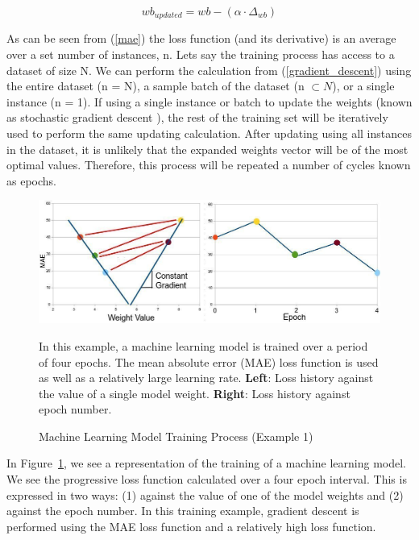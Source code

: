  \begin{equation} \label{gradient_descent}
 	wb_{updated} = wb - (\alpha \cdot \Delta_{wb})
 \end{equation}
 
 \noindent
As can be seen from (\ref{mae}) the loss function (and its derivative) is an average over a set number of instances, n. Lets say the training process has access to a dataset of size N. We can perform the calculation from (\ref{gradient_descent})  using the entire dataset (n = N), a sample batch of the dataset (n $\subset N$), or a single instance (n = 1). If using a single instance or batch to update the weights (known as stochastic gradient descent \cite{ketkar2017stochastic}), the rest of the training set will be iteratively used to perform the same updating calculation. After updating using all instances in the dataset, it is unlikely that the expanded weights vector will be of the most optimal values.  Therefore, this process will be repeated a number of cycles known as epochs.

\begin{figure}[h]
	\centering
	\includegraphics[scale=0.42]{Figures/gradientDescent_mae_bigLR.jpg}
	\caption{Machine Learning Model Training Process (Example 1)} {In this example, a machine learning model is trained over a period of four epochs. The mean absolute error (MAE) loss function is used as well as a relatively large learning rate. \textbf{Left}: Loss history against the value of a single model weight.  \textbf{Right}: Loss history against epoch number.}
	\label{fig:GD_maeBigLR}
\end{figure}

\noindent
In Figure~\ref{fig:GD_maeBigLR}, we see a representation of the training of a machine learning model. We see the progressive loss function calculated over a four epoch interval. This is expressed in two ways: (1) against the value of one of the model weights and (2) against the epoch number.  In this training example, gradient descent is performed using the MAE loss function and a relatively high loss function. \\

